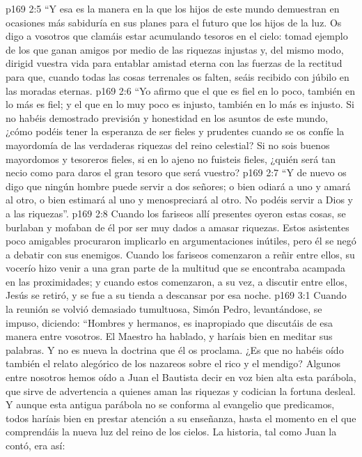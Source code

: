 \vs p169 2:5 “Y esa es la manera en la que los hijos de este mundo demuestran en ocasiones más sabiduría en sus planes para el futuro que los hijos de la luz. Os digo a vosotros que clamáis estar acumulando tesoros en el cielo: tomad ejemplo de los que ganan amigos por medio de las riquezas injustas y, del mismo modo, dirigid vuestra vida para entablar amistad eterna con las fuerzas de la rectitud para que, cuando todas las cosas terrenales os falten, seáis recibido con júbilo en las moradas eternas.
\vs p169 2:6 “Yo afirmo que el que es fiel en lo poco, también en lo más es fiel; y el que en lo muy poco es injusto, también en lo más es injusto. Si no habéis demostrado previsión y honestidad en los asuntos de este mundo, ¿cómo podéis tener la esperanza de ser fieles y prudentes cuando se os confíe la mayordomía de las verdaderas riquezas del reino celestial? Si no sois buenos mayordomos y tesoreros fieles, si en lo ajeno no fuisteis fieles, ¿quién será tan necio como para daros el gran tesoro que será vuestro?
\vs p169 2:7 “Y de nuevo os digo que ningún hombre puede servir a dos señores; o bien odiará a uno y amará al otro, o bien estimará al uno y menospreciará al otro. No podéis servir a Dios y a las riquezas”.
\vs p169 2:8 \pc Cuando los fariseos allí presentes oyeron estas cosas, se burlaban y mofaban de él por ser muy dados a amasar riquezas. Estos asistentes poco amigables procuraron implicarlo en argumentaciones inútiles, pero él se negó a debatir con sus enemigos. Cuando los fariseos comenzaron a reñir entre ellos, su vocerío hizo venir a una gran parte de la multitud que se encontraba acampada en las proximidades; y cuando estos comenzaron, a su vez, a discutir entre ellos, Jesús se retiró, y se fue a su tienda a descansar por esa noche.
\vs p169 3:1 Cuando la reunión se volvió demasiado tumultuosa, Simón Pedro, levantándose, se impuso, diciendo: “Hombres y hermanos, es inapropiado que discutáis de esa manera entre vosotros. El Maestro ha hablado, y haríais bien en meditar sus palabras. Y no es nueva la doctrina que él os proclama. ¿Es que no habéis oído también el relato alegórico de los nazareos sobre el rico y el mendigo? Algunos entre nosotros hemos oído a Juan el Bautista decir en voz bien alta esta parábola, que sirve de advertencia a quienes aman las riquezas y codician la fortuna desleal. Y aunque esta antigua parábola no se conforma al evangelio que predicamos, todos haríais bien en prestar atención a su enseñanza, hasta el momento en el que comprendáis la nueva luz del reino de los cielos. La historia, tal como Juan la contó, era así:
